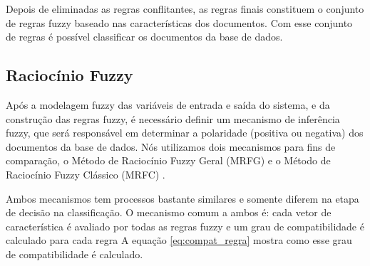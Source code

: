 
%

Depois de eliminadas as regras conflitantes, as regras finais constituem o conjunto de regras fuzzy baseado nas características dos documentos. Com esse conjunto de regras é possível classificar os documentos da base de dados. 

\subsection{Raciocínio Fuzzy}

Após a modelagem fuzzy das variáveis de entrada e saída do sistema, e da construção das regras fuzzy, é necessário definir um mecanismo de inferência fuzzy, que será responsável em determinar a polaridade (positiva ou negativa) dos documentos da base de dados. Nós utilizamos dois mecanismos para fins de comparação, o Método de Raciocínio Fuzzy Geral (MRFG) e o Método de Raciocínio Fuzzy Clássico (MRFC) \cite{cordon1999proposal}.


Ambos mecanismos tem processos bastante similares e somente diferem na etapa de decisão na classificação. O mecanismo comum a ambos é: cada vetor de característica é avaliado por todas as regras fuzzy e um grau de compatibilidade é calculado para cada regra A equação \ref{eq:compat_regra} mostra como esse grau de compatibilidade é calculado. 


